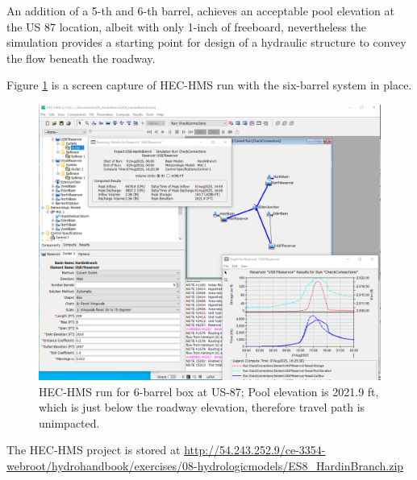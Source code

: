 \documentclass[12pt]{article}
\begin{document}
\clearpage

An addition of a 5-th and 6-th barrel, achieves an acceptable pool elevation at the US 87 location, albeit with only 1-inch of freeboard, nevertheless the simulation provides a starting point for design of a hydraulic structure to convey the flow beneath the roadway.

Figure \ref{fig:6X8by8BoxCulverts} is a screen capture of HEC-HMS run with the six-barrel system in place.

\begin{figure}[h!] %
   \centering
   \includegraphics[width=6in]{6X8by8BoxCulverts.png} 
   \caption{HEC-HMS run for 6-barrel box at US-87; Pool elevation is 2021.9 ft, which is just below the roadway elevation, therefore travel path is unimpacted.}
   \label{fig:6X8by8BoxCulverts}
\end{figure}

The HEC-HMS project is stored at \url{http://54.243.252.9/ce-3354-webroot/hydrohandbook/exercises/08-hydrologicmodels/ES8_HardinBranch.zip}
\end{document}
